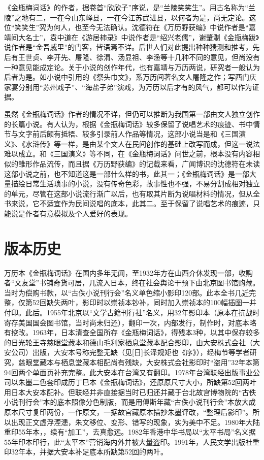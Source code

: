 \documentclass[letter,11pt,onecolumn,oneside]{book}
\begin{document}
《金瓶梅词话》的作者，据卷首“欣欣子”序说，是“兰陵笑笑生”。用古名称为“兰陵”之地有二，一在今山东峄县，一在今江苏武进县，以何者为是，尚无定论。这位“笑笑生”究为何人，也至今无法确认。沈德符在《万历野获编》中说作者是“嘉靖间大名士”，袁中道在《游居柿录》中说作者是“绍兴老儒”，谢肇淛《金瓶梅跋》说作者是“金吾戚里”的门客，皆语焉不详。后世人们对此提出种种猜测和推考，先后有王世贞、李开先、屠隆、徐渭、汤显祖、李渔等十几种不同的意见，但尚没有一种意见能成定论。关于小说的创作年代，也有嘉靖与万历两说，研究者一般认为后者为是。如小说中引用的《祭头巾文》，系万历间著名文人屠隆之作；写西门庆家宴分别用“苏州戏子”、“海盐子弟”演戏，为万历以后才有的风气，都可以作为证据。

虽然《金瓶梅词话》作者的情况不详，但仍可以推断为我国第一部由文人独立创作的长篇小说。有人认为，根据《金瓶梅词话》较多保留了说唱艺术的痕迹、书中情节与文字前后颇有抵牾、较多引录前人作品等情况，这部小说当是和《三国演义》、《水浒传》等一样，是由某个文人在民间创作的基础上改写而成，但这一说法难以成立。和《三国演义》等不同，在《金瓶梅词话》问世之前，根本没有内容相似的雏形作品流传，而且据《万历野获编》的记载来看，广闻博识的沈德符在未读这部小说之前，也不知道这是一部什么样的书，此其一；《金瓶梅词话》是一部大量描绘日常生活琐事的小说，没有传奇色彩，故事性也不强，不易分割成相对独立的单元，尽管在这部小说流行渐广以后，也有取其片断为说唱材料的情况，但从全书来说，它不适宜作为民间说唱的底本，此其二。至于保留了说唱艺术的痕迹，只能说是作者有意模拟及个人爱好的表现。


\section*{版本历史}


万历本《金瓶梅词话》在国内多年无闻，至1932年方在山西介休发现一部，收购者“文友堂”书铺奇货可居，几流入日本，终在社会舆论干预下由北京图书馆购藏。当时为偿购书款，以“古佚小说刊行会”名义单色缩小影印120部。此本全书几近完整，仅第52回缺失两叶，影印时以崇祯本钞补，同时加入崇祯本的100幅插图一并付印。此后。1955年北京以“文学古籍刊行社”名义，用32年影印本（原本在抗战时寄存美国国会图书馆，当时尚未归还），翻印一次，内部发行，制作时，对底本略有挖改。1963年，日本清查全国所存《金瓶梅词话》，得残本3种，以其中保存较多的日光轮王寺慈眼堂藏本和德山毛利家栖息堂藏本配合影印，由大安株式会社（大安公司）出版，大安本号称完整无缺（见[日]长泽规矩也《序》），经梅节等学者研究，慈眼堂藏本与栖息堂藏本相配尚有残缺，大安株式会社影印时“盗用”32年本第94回两个单面页补充完整。此大安本在台湾又有翻印。1978年台湾联经出版事业公司以朱墨二色套印成历丁巳本《金瓶梅词话》，还原原尺寸大小，所缺第52回两叶用日本大安本配补。但联经并非直接据当时已归还并藏于台北故宫博物院的“古佚小说刊行会”本的底本照像分色制版，而是用傅斯年藏“古佚小说刊行会”本放大成原本尺寸复印两份，一作原文，一据故宫藏原本描抄朱墨评改，“整理后影印”。所以出现正文虚浮湮漶，朱文移位、变形、错写的现象，实为美中不足。1980年大陆重印55年本，，续有“加工”，去真愈远。1982年香港中华书局以“太平书局”名义据55年印本印行，此“太平本”营销海内外并被大量盗印。1991年，人民文学出版社重印32年本，并据大安本补足底本所缺第52回的两叶。
\end{document}
